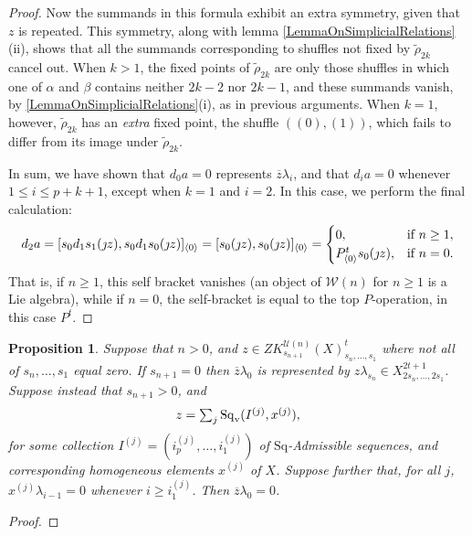 \documentclass[11pt]{amsart}
\theoremstyle{plain}
\newtheorem{prop}[thm]{Proposition}
\theoremstyle{definition}
\newcommand{\calW}{\mathcal{W}}
\newcommand{\calU}{\mathcal{U}}
\theoremstyle{plain}
\newcommand{\Sq}{\mathrm{Sq}}
\begin{document}
\begin{Koszul complexes}
\begin{proof}
Now the summands in this formula exhibit an extra symmetry, given that $z$ is repeated. This symmetry, along with lemma \ref{LemmaOnSimplicialRelations}(ii), shows that all the summands corresponding to shuffles not fixed by $\widetilde{\rho}_{2k}$ cancel out. When $k>1$, the fixed points of $\widetilde{\rho}_{2k}$ are only those shuffles in which one of $\alpha$ and $\beta$ contains neither $2k-2$ nor $2k-1$, and these summands vanish, by \ref{LemmaOnSimplicialRelations}(i), as in previous arguments. When $k=1$, however, $\widetilde{\rho}_{2k}$ has an \emph{extra} fixed point, the shuffle $((0),(1))$, which fails to differ from its image under $\widetilde{\rho}_{2k}$.

In sum, we have shown that $d_0a=0$ represents $\overline{z}\lambda_i$, and that $d_ia=0$ whenever $1\leq i\leq p+k+1$, except when $k=1$ and $i=2$. In this case, we perform the final calculation:
\[d_2a=[s_{0}d_1s_1(\jmath z), s_{0}d_1s_0(\jmath z)]_{\langle 0\rangle}=[s_{0}(\jmath z), s_{0}(\jmath z)]_{\langle 0\rangle}=\begin{cases}
0,&\textup{if }n\geq1,\\
P^{t}_{\langle 0\rangle}s_0(\jmath z),&\textup{if }n=0.
\end{cases}\]
That is, if $n\geq1$, this self bracket vanishes (an object of $\calW(n)$ for $n\geq1$ is a Lie algebra), while if $n=0$, the self-bracket is equal to the top $P$-operation, in this case $P^t$. %
\end{proof}
\begin{prop}
Suppose that $n>0$, and $z\in ZK^{\calU(n)}_{s_{n+1}}(X)_{s_n,\ldots,s_1}^t$ where not all of $s_n,\ldots,s_1$ equal zero. If $s_{n+1}=0$ then $\overline{z}\lambda_0$ is represented by $z\lambda_{s_n}\in X_{2s_n,\ldots,2s_1}^{2t+1}$. Suppose instead that $s_{n+1}>0$, and 
\[z=\textstyle\sum_{j}\Sq_\textup{v}(I^{(j)},x^{(j)}),\]
for some collection $I^{(j)}=(i^{(j)}_{p},\ldots,i^{(j)}_{1})$ of  $\Sq$-Admissible sequences, and corresponding homogeneous elements $x^{(j)}$ of $X$. Suppose further that, for all $j$, $x^{(j)}\lambda_{i-1}=0$ whenever $i\geq i^{{(j)}}_1$. Then $\overline{z}\lambda_0=0$.
\end{prop}
\begin{proof}

\end{proof}
\end{Koszul complexes}
\end{document}
